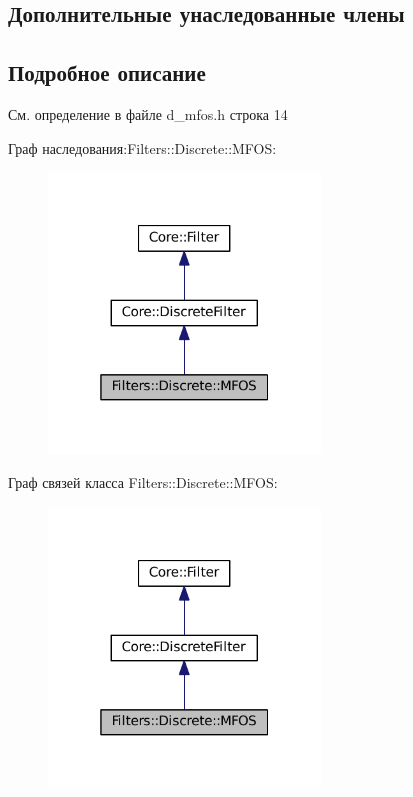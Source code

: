 \subsection*{Дополнительные унаследованные члены}


\subsection{Подробное описание}


См. определение в файле d\+\_\+mfos.\+h строка 14



Граф наследования\+:Filters\+:\+:Discrete\+:\+:M\+F\+OS\+:\nopagebreak
\begin{figure}[H]
\begin{center}
\leavevmode
\includegraphics[width=205pt]{class_filters_1_1_discrete_1_1_m_f_o_s__inherit__graph}
\end{center}
\end{figure}


Граф связей класса Filters\+:\+:Discrete\+:\+:M\+F\+OS\+:\nopagebreak
\begin{figure}[H]
\begin{center}
\leavevmode
\includegraphics[width=205pt]{class_filters_1_1_discrete_1_1_m_f_o_s__coll__graph}
\end{center}
\end{figure}


